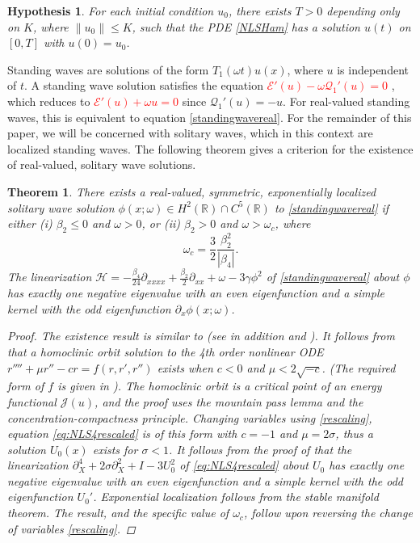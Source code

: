 \documentclass[12pt]{elsarticle}
\def\R{{\mathbb R}}
\def\calH{{\mathcal H}}
\def\calE{{\mathcal E}}
\def\calQ{{\mathcal Q}}
\def\calJ{{\mathcal J}}
\newtheorem{theorem}{Theorem}
\newtheorem{hypothesis}{Hypothesis}
\newcommand{\revised}[1]{ \textcolor{red}{#1} }
\begin{document}
\begin{hypothesis}\label{hyp:wp}
For each initial condition $u_0$, there exists $T > 0$ depending only on $K$, where $\|u_0\| \leq K$, such that the PDE \cref{NLSHam} has a solution $u(t)$ on $[0, T]$ with $u(0) = u_0$.
\end{hypothesis}

Standing waves are solutions of the form $T_1(\omega t) u(x)$, where $u$ is independent of $t$. A standing wave solution satisfies the equation \revised{$\calE'(u) - \omega \calQ_1'(u) = 0$}, which reduces to \revised{$\calE'(u) + \omega u = 0$} since $\calQ_1'(u) = -u$. For real-valued standing waves, this is equivalent to equation \cref{standingwavereal}. For the remainder of this paper, we will be concerned with solitary waves, which in this context are localized standing waves. The following theorem gives a criterion for the existence of real-valued, solitary wave solutions.

\begin{theorem}\label{theorem:solitonexist}
There exists a real-valued, symmetric, exponentially localized solitary wave solution $\phi(x; \omega) \in H^2(\R) \cap C^5(\R)$ to \cref{standingwavereal} if either (i) $\beta_2 \leq 0$ and $\omega > 0$, or (ii) $\beta_2 > 0$ and $\omega > \omega_c$, where 
\begin{equation}\label{omegac}
\omega_c = \frac{3}{2} \frac{\beta_2^2}{|\beta_4|}.
\end{equation}
The linearization $\calH = -\frac{\beta_4}{24} \partial_{xxxx} + \frac{\beta_2}{2} \partial_{xx} + \omega - 3 \gamma \phi^2$ of \cref{standingwavereal} about $\phi$ has exactly one negative eigenvalue with an even eigenfunction and a simple kernel with the odd eigenfunction $\partial_x \phi(x; \omega)$.
\begin{proof}
The existence result is similar to \cite[Theorem 2.1(i)]{Pelinovsky2007} (see in addition \cite[Theorem 1.1]{Bonheure2014} and \cite[Theorem 1.2]{Bonheure2018}). It follows from \cite{Groves1998} that a homoclinic orbit solution to the 4th order nonlinear ODE $r'''' + \mu r'' - cr = f(r, r', r'')$ exists when $c < 0$ and $\mu < 2 \sqrt{-c}$. (The required form of $f$ is given in \cite{Groves1998}). The homoclinic orbit is a critical point of an energy functional $\calJ(u)$, and the proof uses the mountain pass lemma and the concentration-compactness principle. Changing variables using \cref{rescaling}, equation \cref{eq:NLS4rescaled} is of this form with $c = -1$ and $\mu = 2 \sigma$, thus a solution $U_0(x)$ exists for $\sigma < 1$. It follows from the proof of \cite[Theorem 2.1(ii)]{Pelinovsky2007} that the linearization $\partial_X^4 + 2 \sigma \partial_X^2 + I - 3 U_0^2$ of \cref{eq:NLS4rescaled} about $U_0$ has exactly one negative eigenvalue with an even eigenfunction and a simple kernel with the odd eigenfunction $U_0'$. Exponential localization follows from the stable manifold theorem. The result, and the specific value of $\omega_c$, follow upon reversing the change of variables \cref{rescaling}.
\end{proof}
\end{theorem}
\end{document}
